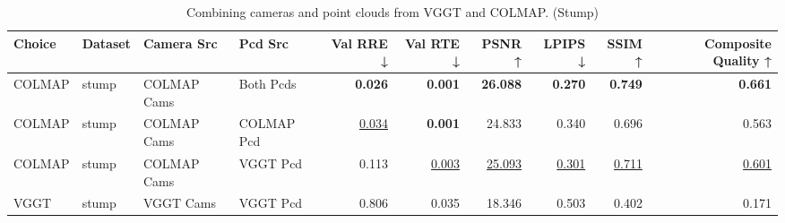\begin{table}[H]
\caption{\ifdefined\customcaption \customcaption \else Combining cameras and point clouds from VGGT and COLMAP. (Stump) \fi}
\label{tab:07_combined_single_stump}
\centering
\tiny
\begin{tabular}{llllrrrrrr}
\toprule
Choice & Dataset & Camera Src & Pcd Src & Val RRE ↓ & Val RTE ↓ & PSNR ↑ & LPIPS ↓ & SSIM ↑ & Composite Quality ↑ \\
\midrule
COLMAP & stump & COLMAP Cams & Both Pcds & \textbf{0.026} & \textbf{0.001} & \textbf{26.088} & \textbf{0.270} & \textbf{0.749} & \textbf{0.661} \\
COLMAP & stump & COLMAP Cams & COLMAP Pcd & \underline{0.034} & \textbf{0.001} & 24.833 & 0.340 & 0.696 & 0.563 \\
COLMAP & stump & COLMAP Cams & VGGT Pcd & 0.113 & \underline{0.003} & \underline{25.093} & \underline{0.301} & \underline{0.711} & \underline{0.601} \\
VGGT & stump & VGGT Cams & VGGT Pcd & 0.806 & 0.035 & 18.346 & 0.503 & 0.402 & 0.171 \\
\bottomrule
\end{tabular}
\end{table}